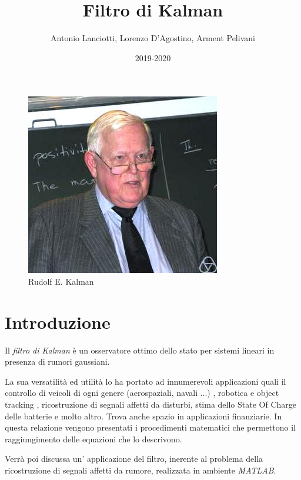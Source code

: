 \documentclass{article}
\title{Filtro di Kalman}
\author{Antonio Lanciotti, Lorenzo D'Agostino, Arment Pelivani}
\date{2019-2020}
\numberwithin{equation}{section}
\begin{document}
\maketitle

\begin{figure}[ht]
\centering
\includegraphics[scale=1]{Rudolf_Kalman} 
\caption{Rudolf E. Kalman}
\label{fig:kalman}
\end{figure}

\newpage

\tableofcontents

\newpage



\section{Introduzione}
Il \textit{filtro di Kalman} è un osservatore ottimo dello stato per sistemi lineari in presenza di rumori gaussiani.

La sua versatilità ed utilità lo ha portato ad innumerevoli applicazioni quali il controllo di veicoli di ogni genere (aerospaziali, navali ...)\cite{veicoli} , robotica e object tracking \cite{Vision}, ricostruzione di segnali affetti da disturbi, stima dello State Of Charge \cite{SOC} delle batterie e molto altro. Trova anche spazio in applicazioni finanziarie\cite{Finanza}.
In questa relazione vengono presentati i procedimenti matematici che permettono il raggiungimento delle equazioni che lo descrivono.

Verrà poi discussa un' applicazione del filtro, inerente al problema della ricostruzione di segnali affetti da rumore, realizzata in ambiente \textit{MATLAB}.

\newpage















\newpage


\end{document}
